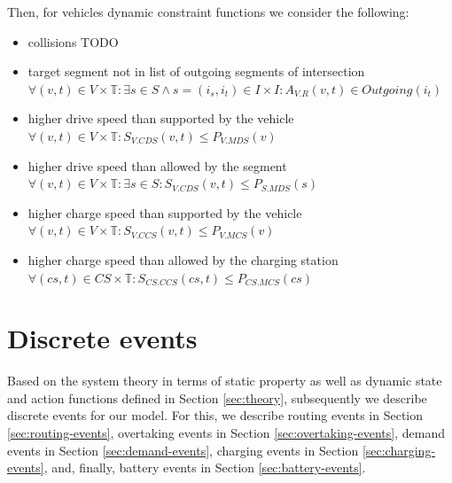 \documentclass[graybox]{svmult}
\begin{document}
Then, for vehicles dynamic constraint functions we consider the following:
\begin{itemize}
	\item collisions TODO
	\item target segment not in list of outgoing segments of intersection $\forall (v,t) \in V \times \mathbb{T}: \exists s \in S \wedge s = (i_s, i_t) \in I \times I: A_{V.R}(v, t) \in Outgoing(i_t)$
	
	\item higher drive speed than supported by the vehicle $\forall (v,t) \in V \times \mathbb{T}: S_{V.CDS}(v,t) \leq P_{V.MDS}(v)$
	\item higher drive speed than allowed by the segment $\forall (v,t) \in V \times \mathbb{T}: \exists s \in S: S_{V.CDS}(v,t) \leq P_{S.MDS}(s)$
	\item higher charge speed than supported by the vehicle $\forall (v,t) \in V \times \mathbb{T}: S_{V.CCS}(v,t) \leq P_{V.MCS}(v)$
	\item higher charge speed than allowed by the charging station $\forall (cs,t) \in CS \times \mathbb{T}: S_{CS.CCS}(cs,t) \leq P_{CS.MCS}(cs)$
\end{itemize}

\section{Discrete events}
\label{sec:events}
Based on the system theory in terms of static property as well as dynamic state and action functions defined in Section \ref{sec:theory}, subsequently we describe discrete events for our model. For this, we describe routing events in Section \ref{sec:routing-events}, overtaking events in Section \ref{sec:overtaking-events}, demand events in Section \ref{sec:demand-events}, charging events in Section \ref{sec:charging-events}, and, finally, battery events in Section \ref{sec:battery-events}.
\end{document}
